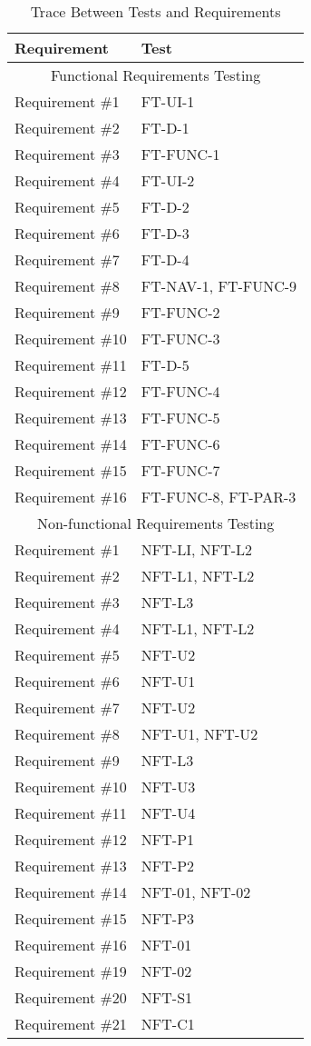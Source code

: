 \documentclass[12pt, titlepage]{article}
\begin{document}
		\begin{table}[!htbp]
			\begin{tabular}{ll}
				\toprule
				Requirement & Test \\
				\midrule
				\multicolumn{2}{c}{Functional Requirements Testing} \\
				\midrule
				Requirement \#1 & FT-UI-1 \\
				Requirement \#2 & FT-D-1 \\
				Requirement \#3 & FT-FUNC-1 \\
				Requirement \#4 & FT-UI-2 \\
				Requirement \#5 & FT-D-2 \\
				Requirement \#6 & FT-D-3 \\
				Requirement \#7 & FT-D-4 \\
				Requirement \#8 & FT-NAV-1, FT-FUNC-9 \\
				Requirement \#9 & FT-FUNC-2 \\
				Requirement \#10 & FT-FUNC-3 \\
				Requirement \#11 & FT-D-5 \\
				Requirement \#12 & FT-FUNC-4 \\
				Requirement \#13 & FT-FUNC-5 \\
				Requirement \#14 & FT-FUNC-6 \\
				Requirement \#15 & FT-FUNC-7 \\
				Requirement \#16 & FT-FUNC-8, FT-PAR-3 \\
				\midrule
				\multicolumn{2}{c}{Non-functional Requirements Testing} \\
				\midrule
				Requirement \#1 & NFT-LI, NFT-L2 \\
				Requirement \#2 & NFT-L1, NFT-L2 \\
				Requirement \#3 & NFT-L3 \\
				Requirement \#4 & NFT-L1, NFT-L2 \\
				Requirement \#5 & NFT-U2\\
				Requirement \#6 & NFT-U1 \\
				Requirement \#7 & NFT-U2 \\
				Requirement \#8 & NFT-U1, NFT-U2 \\
				Requirement \#9 & NFT-L3 \\
				Requirement \#10 & NFT-U3 \\
				Requirement \#11 & NFT-U4 \\
				Requirement \#12 & NFT-P1 \\
				Requirement \#13 & NFT-P2 \\
				Requirement \#14 & NFT-01, NFT-02 \\
				Requirement \#15 & NFT-P3 \\
				Requirement \#16 & NFT-01 \\
				Requirement \#19 & NFT-02 \\
				Requirement \#20 & NFT-S1 \\
				Requirement \#21 & NFT-C1 \\
				\bottomrule
			\end{tabular}
			\caption{Trace Between Tests and Requirements}
			\label{Table}
		\end{table}
\end{document}
